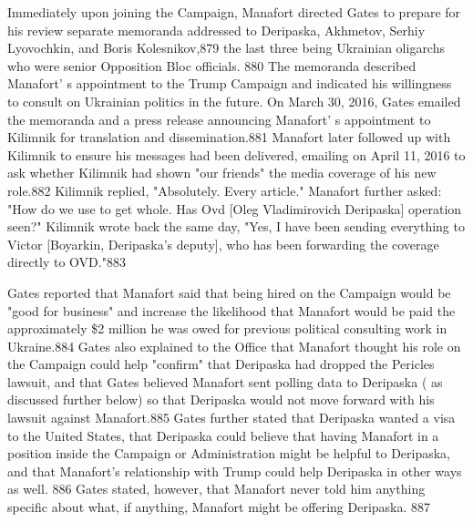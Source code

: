 Immediately upon joining the Campaign, Manafort directed Gates to prepare for his review separate memoranda addressed to Deripaska, Akhmetov, Serhiy Lyovochkin, and Boris Kolesnikov,879 the last three being Ukrainian oligarchs who were senior Opposition Bloc officials. 880 The memoranda described Manafort' s  appointment to the Trump Campaign and indicated his willingness to consult on Ukrainian politics in the future. On March 30, 2016, Gates emailed the memoranda and a press release announcing Manafort' s appointment to Kilimnik for translation and dissemination.881 Manafort later followed up with Kilimnik to ensure his messages had been delivered, emailing on April 11, 2016 to ask whether Kilimnik had shown "our friends" the media coverage of his new role.882 Kilimnik replied, "Absolutely. Every article." Manafort further asked: "How do we use to get whole. Has Ovd [Oleg Vladimirovich Deripaska] operation seen?" Kilimnik wrote back the same day, "Yes, I  have been sending everything to Victor [Boyarkin, Deripaska's deputy], who has been forwarding the coverage directly to OVD."883

Gates reported that Manafort said that being hired on the Campaign would be "good for business" and increase the likelihood that Manafort would be paid the approximately \$2 million he was owed for previous political consulting work in Ukraine.884 Gates also explained to the Office that Manafort thought his role on the Campaign could help "confirm" that Deripaska had dropped the Pericles lawsuit, and that Gates believed Manafort sent polling data to Deripaska ( as discussed further below) so that Deripaska would not move forward with his lawsuit against Manafort.885 Gates further stated that Deripaska wanted a visa to the United States, that Deripaska could believe that having Manafort in a position inside the Campaign or Administration might be helpful to Deripaska, and that Manafort's relationship with Trump could help Deripaska in other ways as well. 886 Gates stated, however, that Manafort never told him anything specific about what, if anything, Manafort might be offering Deripaska. 887


